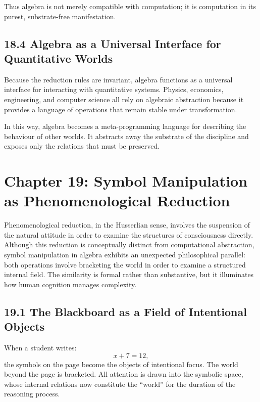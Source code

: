 \documentclass[12pt,letterpaper]{article}
\theoremstyle{remark}
\begin{document}
Thus algebra is not merely compatible with computation; it is computation in its purest, substrate-free manifestation.

\subsection{18.4 Algebra as a Universal Interface for Quantitative Worlds}

Because the reduction rules are invariant, algebra functions as a universal interface for interacting with quantitative systems. Physics, economics, engineering, and computer science all rely on algebraic abstraction because it provides a language of operations that remain stable under transformation.

In this way, algebra becomes a meta-programming language for describing the behaviour of other worlds. It abstracts away the substrate of the discipline and exposes only the relations that must be preserved.

\newpage

\section{Chapter 19: Symbol Manipulation as Phenomenological Reduction}

Phenomenological reduction, in the Husserlian sense, involves the suspension of the natural attitude in order to examine the structures of consciousness directly. Although this reduction is conceptually distinct from computational abstraction, symbol manipulation in algebra exhibits an unexpected philosophical parallel: both operations involve bracketing the world in order to examine a structured internal field. The similarity is formal rather than substantive, but it illuminates how human cognition manages complexity.

\subsection{19.1 The Blackboard as a Field of Intentional Objects}

When a student writes:
\[
x + 7 = 12,
\]
the symbols on the page become the objects of intentional focus. The world beyond the page is bracketed. All attention is drawn into the symbolic space, whose internal relations now constitute the ``world'' for the duration of the reasoning process.
\end{document}
